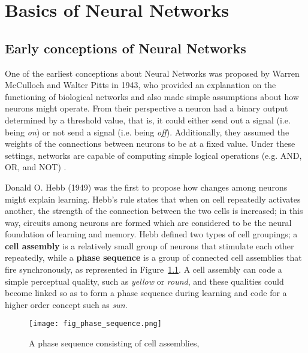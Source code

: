 \documentclass{WileySev}
\begin{document}
\chapter[Basics of Neural Networks]
{Basics of Neural Networks}

\section{Early conceptions of Neural Networks} \label{sec:historic}

One of the earliest conceptions about Neural Networks was proposed by Warren McCulloch and Walter Pitts in 1943, who provided an explanation on the functioning of biological networks and also made simple assumptions about how neurons might operate. From their perspective a neuron had a binary output determined by a threshold value, that is, it could either send out a signal (i.e. being \textit{on}) or not send a signal (i.e. being \textit{off}). Additionally, they assumed the weights of the connections between neurons to be at a fixed value. Under these settings, networks are capable of computing simple logical operations (e.g. AND, OR, and NOT) \cite[chap. 7]{friedenberg2011cognitive}.

Donald O. Hebb (1949) was the first to propose how changes among neurons might explain learning. Hebb's rule states that when on cell repeatedly activates another, the strength of the connection between the two cells is increased; in this way, circuits among neurons are formed which are considered to be the neural foundation of learning and memory. Hebb defined two types of cell groupings; a \textbf{cell assembly} is a relatively small group of neurons that stimulate each other repeatedly, while a \textbf{phase sequence} is a group of connected cell assemblies that fire synchronously, as represented in Figure~\ref{fig:phase sequence}. A cell assembly can code a simple perceptual quality, such as \textit{yellow} or \textit{round}, and these qualities could become linked so as to form a phase sequence during learning and code for a higher order concept such as \textit{sun}. 

\begin{figure}
 \texttt{[image: fig\_phase\_sequence.png]}
  \centering
  \caption{A phase sequence consisting of cell assemblies, \cite{friedenberg2011cognitive}}
  \label{fig:phase sequence}
\end{figure} 
\end{document}
